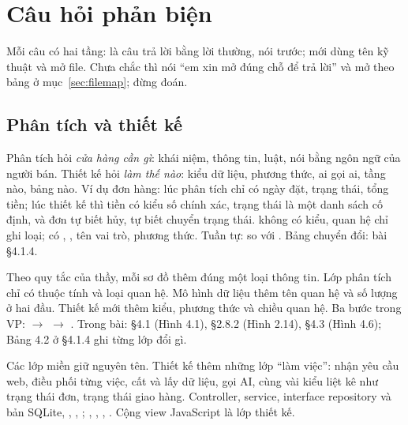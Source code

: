 \section{Câu hỏi phản biện}\label{sec:hoidap}
Mỗi câu có hai tầng:  là câu trả lời bằng lời thường, nói trước;  mới dùng tên kỹ thuật và mở file. Chưa chắc thì nói ``em xin mở đúng chỗ để trả lời'' và mở theo bảng ở mục~\ref{sec:filemap}; đừng đoán.

\subsection{Phân tích và thiết kế}
{Phân tích hỏi \emph{cửa hàng cần gì}: khái niệm, thông tin, luật, nói bằng ngôn ngữ của người bán. Thiết kế hỏi \emph{làm thế nào}: kiểu dữ liệu, phương thức, ai gọi ai, tầng nào, bảng nào. Ví dụ đơn hàng: lúc phân tích chỉ có ngày đặt, trạng thái, tổng tiền; lúc thiết kế thì tiền có kiểu số chính xác, trạng thái là một danh sách cố định, và đơn tự biết hủy, tự biết chuyển trạng thái.}
{ không có kiểu, quan hệ chỉ ghi loại;  có , , tên vai trò, phương thức. Tuần tự:  so với . Bảng chuyển đổi: bài §4.1.4.}

{Theo quy tắc của thầy, mỗi sơ đồ thêm đúng một loại thông tin. Lớp phân tích chỉ có thuộc tính và loại quan hệ. Mô hình dữ liệu thêm tên quan hệ và số lượng ở hai đầu. Thiết kế mới thêm kiểu, phương thức và chiều quan hệ.}
{Ba bước trong VP:  $\to$  $\to$ . Trong bài: §4.1 (Hình 4.1), §2.8.2 (Hình 2.14), §4.3 (Hình 4.6); Bảng 4.2 ở §4.1.4 ghi từng lớp đổi gì.}

{Các lớp miền giữ nguyên tên. Thiết kế thêm những lớp ``làm việc'': nhận yêu cầu web, điều phối từng việc, cất và lấy dữ liệu, gọi AI, cùng vài kiểu liệt kê như trạng thái đơn, trạng thái giao hàng.}
{Controller, service, interface repository và bản SQLite, , , ; , , , . Cộng \factJsViews{} view JavaScript là \factDesignClasses{} lớp thiết kế.}


